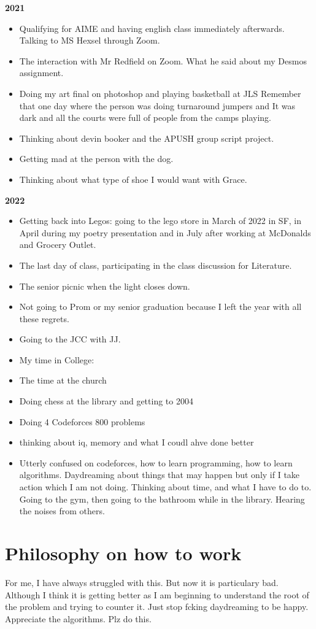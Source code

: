 \documentclass[12pt]{article}
\begin{document}
 \textbf{2021}\begin{itemize}
\item Qualifying for AIME and having english class immediately afterwards. Talking to MS Hexsel through Zoom. \item The interaction with Mr Redfield on Zoom. What he said about my Desmos assignment. \item Doing my art final on photoshop and playing basketball at JLS Remember that one day where the person was doing turnaround jumpers and It was dark and all the courts were full of people from the camps playing.\item Thinking about devin booker and the APUSH group script project. \item Getting mad at the person with the dog. \item Thinking about what type of shoe I would want with Grace. 
\end{itemize}
 \textbf{2022}
\begin{itemize}
\item Getting back into Legos: going to the lego store in March of 2022 in SF, in April during my poetry presentation and in July after working at McDonalds and Grocery Outlet. \item The last day of class, participating in the class discussion for Literature.\item The senior picnic when the light closes down.\item Not going to Prom or my senior graduation because I left the year with all these regrets.
\item Going to the JCC with JJ.
\item My time in College: 
\item The time at the church
\item Doing chess at the library and getting to 2004
\item Doing 4 Codeforces 800 problems
\item thinking about iq, memory and what I coudl ahve done better
\item Utterly confused on codeforces, how to learn programming, how to learn algorithms. Daydreaming about things that may happen but only if I take action which I am not doing. Thinking about time, and what I have to do to. Going to the gym, then going to the bathroom while in the library. Hearing the noises from others. 
\end{itemize}

\section{Philosophy on how to work}
For me, I have always struggled with this. But now it is particulary bad. Although I think it is getting better as I am beginning to understand the root of the problem and trying to counter it. Just stop fcking daydreaming to be happy. Appreciate the algorithms. Plz do this.
\end{document}
